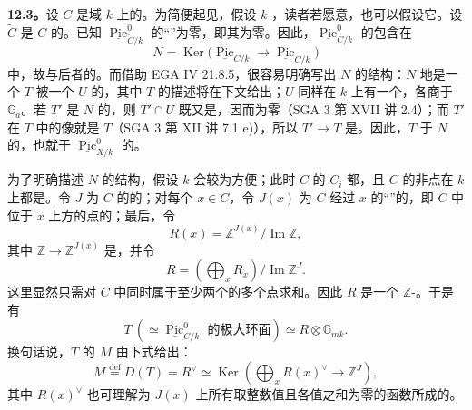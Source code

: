 \textbf{12.3。}设 $C$ 是域 $k$ 上的。为简便起见，假设 $k$ ，读者若愿意，也可以假设它。设 $\widetilde C$ 是 $C$ 的。已知
$\underline{\operatorname{Pic}}_{\widetilde C/k}^0$ 的“”为零，即其为零。因此，$\underline{\operatorname{Pic}}_{C/k}^0$ 的包含在
\[
 N=\operatorname{Ker}\bigl(\underline{\operatorname{Pic}}_{C/k}\longrightarrow
 \underline{\operatorname{Pic}}_{\widetilde C/k}\bigr)
\]
中，故与后者的。而借助 EGA IV 21.8.5，很容易明确写出 $N$ 的结构：$N$ 地是一个 $T$ 被一个 $U$ 的，其中 $T$ 的描述将在下文给出；$U$ 同样在 $k$ 上有一个，各商于 $\mathbb G_a$。若 $T'$ 是 $N$ 的，则 $T'\cap U$ 既又是，因而为零（SGA 3 第 XVII 讲 2.4）；而 $T'$ 在 $T$ 中的像就是 $T$（SGA 3 第 XII 讲 7.1 e)），所以 $T'\to T$ 是。因此，$T$ 于 $N$ 的，也就于 $\underline{\operatorname{Pic}}_{X/k}^0$ 的。

为了明确描述 $N$ 的结构，假设 $k$ 会较为方便；此时 $C$ 的 $C_i$ 都，且 $C$ 的非点在 $k$ 上都是。令 $J$ 为 $\widetilde C$ 的的；对每个 $x\in C$，令 $J(x)$ 为 $C$ 经过 $x$ 的“”的，即 $\widetilde C$ 中位于 $x$ 上方的点的；最后，令
\[
 R(x)=\mathbb Z^{J(x)}/\operatorname{Im}\mathbb Z,\tag{12.3.1}
\]
其中 $\mathbb Z\to\mathbb Z^{J(x)}$ 是，并令
\[
 R=\left(\bigoplus_x R_x\right)/\operatorname{Im}\mathbb Z^J.\tag{12.3.2}
\]
这里显然只需对 $C$ 中同时属于至少两个的多个点求和。因此 $R$ 是一个 $\mathbb Z$-。于是有
\[
 T\ (\simeq\underline{\operatorname{Pic}}_{C/k}^0\text{ 的极大环面})
 \simeq R\otimes\mathbb G_{mk}.\tag{12.2.3}
\]
换句话说，$T$ 的 $M$ 由下式给出：
\[
 M\overset{\mathrm{def}}=D(T)=R^\vee
 \simeq\operatorname{Ker}\left(\bigoplus_x R(x)^\vee\longrightarrow\mathbb Z^J\right),\tag{12.2.4}
\]
其中 $R(x)^\vee$ 也可理解为 $J(x)$ 上所有取整数值且各值之和为零的函数所成的。

